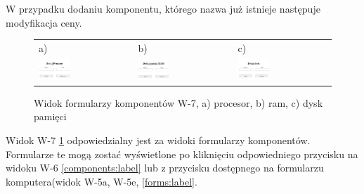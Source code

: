 W przypadku dodaniu komponentu, którego nazwa już istnieje następuje modyfikacja ceny.


\begin{figure}[htb]
  \centering
	\begin{tabular}{@{}lll@{}}
	a) & b) & c) \\
  \includegraphics[width=0.35\textwidth]{rys05/view/addProc.pdf} & 
	\includegraphics[width=0.35\textwidth]{rys05/view/addRam.pdf} &
	\includegraphics[width=0.35\textwidth]{rys05/view/addStorage.pdf}
	\end{tabular}
  \caption{Widok formularzy komponentów W-7, a) procesor, b) ram, c) dysk pamięci}
  \label{compforms:label}
\end{figure}

Widok W-7 \ref{compforms:label} odpowiedzialny jest za widoki formularzy komponentów. Formularze te mogą zostać wyświetlone po kliknięciu odpowiedniego przycisku na widoku W-6 \ref{components:label} lub z przycisku dostępnego na formularzu komputera(widok W-5a, W-5e, \ref{forms:label}.



